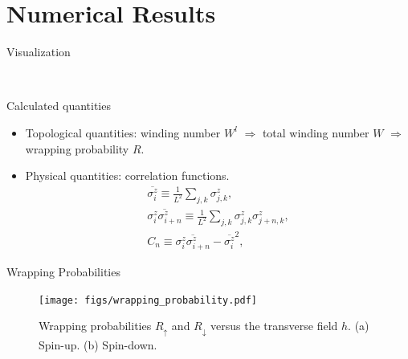 \documentclass[aspectratio=43]{beamer}
\begin{document}
\section{Numerical Results}
\begin{frame}{Visualization}
  \vspace{-3mm}
  \begin{figure}[htpb]
    \centering
    \hspace{12mm}
    \\
    \vspace{-3mm}
    \hspace{12mm}
  \end{figure}
\end{frame}

\begin{frame}{Calculated quantities}
  \begin{itemize}
    \item Topological quantities: winding number $W^l$ $\Rightarrow$ total winding number $W$ $\Rightarrow$ wrapping probability $R$.
    \item Physical quantities: correlation functions.
      \begin{gather*}
        \overline{\sigma_i^z} \equiv \frac{1}{L^2}\sum_{j,k}\sigma_{j,k}^z,\\
        \overline{\sigma_i^z \sigma_{i+n}^z} \equiv \frac{1}{L^2} \sum_{j,k}\sigma_{j,k}^z \sigma_{j+n,k}^z,\\
        C_n \equiv \overline{\sigma_i^z \sigma_{i+n}^z}-\overline{\sigma_i^z}^2,
      \end{gather*}
  \end{itemize}
\end{frame}

\begin{frame}{Wrapping Probabilities}
  \begin{figure}[htpb]
    \centering
    \texttt{[image: figs/wrapping\_probability.pdf]}
    \caption{Wrapping probabilities $R_\uparrow$ and $R_\downarrow$ versus the transverse field $h$. (a) Spin-up. (b) Spin-down.}
    \label{fig:wrapping_probability}
  \end{figure}
\end{frame}
\end{document}
